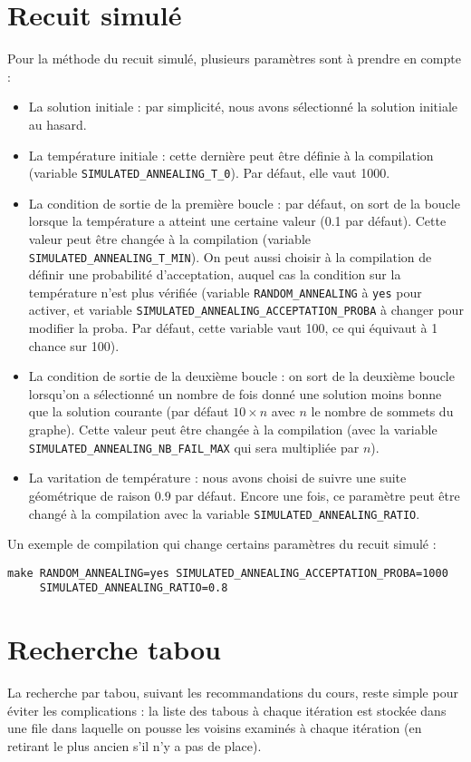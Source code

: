 \documentclass[12pt, a4paper]{article}
\begin{document}
\section{Recuit simulé}
Pour la méthode du recuit simulé, plusieurs paramètres sont à prendre en compte :
\begin{itemize}
\item La solution initiale : par simplicité, nous avons sélectionné la solution initiale au hasard.
\item La température initiale : cette dernière peut être définie à la compilation (variable \texttt{SIMULATED\_ANNEALING\_T\_0}). Par défaut, elle vaut 1000.
\item La condition de sortie de la première boucle : par défaut, on sort de la boucle lorsque la température a atteint une certaine valeur (0.1 par défaut). Cette valeur peut être changée à la compilation (variable \texttt{SIMULATED\_ANNEALING\_T\_MIN}). On peut aussi choisir à la compilation de définir une probabilité d'acceptation, auquel cas la condition sur la température n'est plus vérifiée (variable \texttt{RANDOM\_ANNEALING} à \texttt{yes} pour activer, et variable \texttt{SIMULATED\_ANNEALING\_ACCEPTATION\_PROBA} à changer pour modifier la proba. Par défaut, cette variable vaut 100, ce qui équivaut à 1 chance sur 100).
\item La condition de sortie de la deuxième boucle : on sort de la deuxième boucle lorsqu'on a sélectionné un nombre de fois donné une solution moins bonne que la solution courante (par défaut $10 \times n$ avec $n$ le nombre de sommets du graphe). Cette valeur peut être changée à la compilation (avec la variable \texttt{SIMULATED\_ANNEALING\_NB\_FAIL\_MAX} qui sera multipliée par $n$).
\item La varitation de température : nous avons choisi de suivre une suite géométrique de raison $0.9$ par défaut. Encore une fois, ce paramètre peut être changé à la compilation avec la variable \texttt{SIMULATED\_ANNEALING\_RATIO}.
\end{itemize}

Un exemple de compilation qui change certains paramètres du recuit simulé :
\begin{verbatim}
make RANDOM_ANNEALING=yes SIMULATED_ANNEALING_ACCEPTATION_PROBA=1000
     SIMULATED_ANNEALING_RATIO=0.8
\end{verbatim}
\section{Recherche tabou}
La recherche par tabou, suivant les recommandations du cours, reste
simple pour éviter les complications : la liste des tabous à chaque itération est stockée 
dans une file dans laquelle on pousse les voisins examinés 
à chaque itération (en retirant le plus ancien s'il n'y a pas de place).
\end{document}
